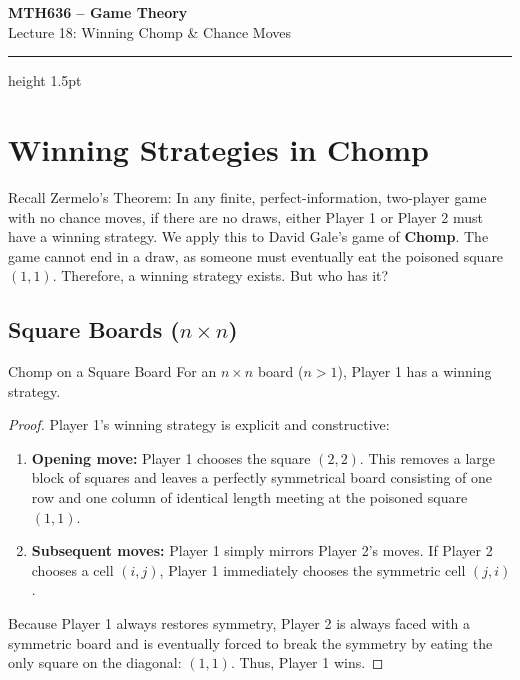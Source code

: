 \documentclass[12pt, a4paper]{article}
\begin{document}
\begin{center}
  {\LARGE\bfseries\sffamily\color{defblue} MTH636 -- Game Theory}\\[6pt]
  {\Large\sffamily Lecture 18: Winning Chomp \& Chance Moves}\\[4pt]
\end{center}
\vspace{0.5cm}
\hrule height 1.5pt
\vspace{0.3cm}

\section{Winning Strategies in Chomp}

Recall Zermelo's Theorem: In any finite, perfect-information, two-player game with no chance moves, if there are no draws, either Player 1 or Player 2 must have a winning strategy.
We apply this to David Gale's game of \textbf{Chomp}. The game cannot end in a draw, as someone must eventually eat the poisoned square $(1,1)$. Therefore, a winning strategy exists. But who has it?

\subsection{Square Boards ($n \times n$)}
\begin{thmbox}{Chomp on a Square Board}
  For an $n \times n$ board ($n > 1$), Player 1 has a winning strategy.
\end{thmbox}

\begin{proof}
  Player 1's winning strategy is explicit and constructive:
  \begin{enumerate}
      \item \textbf{Opening move:} Player 1 chooses the square $(2,2)$. This removes a large block of squares and leaves a perfectly symmetrical board consisting of one row and one column of identical length meeting at the poisoned square $(1,1)$.
      \item \textbf{Subsequent moves:} Player 1 simply mirrors Player 2's moves. If Player 2 chooses a cell $(i, j)$, Player 1 immediately chooses the symmetric cell $(j, i)$.
  \end{enumerate}
  Because Player 1 always restores symmetry, Player 2 is always faced with a symmetric board and is eventually forced to break the symmetry by eating the only square on the diagonal: $(1,1)$. Thus, Player 1 wins.
\end{proof}
\end{document}
